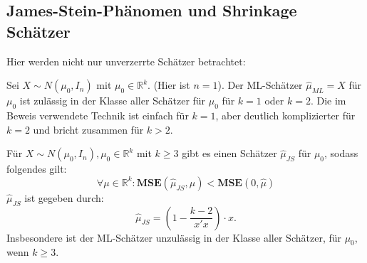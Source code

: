 \documentclass[10pt]{article}
\newcommand{\IR}{\mathbb{R}} %
\newcommand{\MSE}{\textbf{MSE}} %
\begin{document}
	\subsection{James-Stein-Phänomen und Shrinkage Schätzer}

	Hier werden nicht nur unverzerrte Schätzer betrachtet:
	
	\begin{Proposition}
		Sei $X \sim N(\mu_0, I_n)$ mit $\mu_0 \in \IR^k.$ (Hier ist $n=1$). Der ML-Schätzer $\hat{\mu}_{ML} = X$ für $\mu_0$ ist zulässig in der Klasse aller Schätzer für $\mu_0$ für $k=1$ oder $k=2$. Die im Beweis verwendete Technik ist einfach für $k=1$, aber deutlich komplizierter für $k=2$ und bricht zusammen für $k>2$. 
		
		Für $X \sim N(\mu_0, I_n), \mu_0 \in \IR^k$ mit $k \geq 3$ gibt es einen Schätzer $\hat{\mu}_{JS}$ für $\mu_0$, sodass folgendes gilt:
		\begin{equation*}
			\forall \mu \in \IR^k: \MSE(\hat{\mu}_{JS}, \mu) < \MSE(0,\hat{\mu})
		\end{equation*}
		$\hat{\mu}_{JS}$ ist gegeben durch:
		\begin{equation*}
			\hat{\mu}_{JS} = \left(1-\frac{k-2}{x'x}\right) \cdot x.
		\end{equation*}
		Insbesondere ist der ML-Schätzer unzulässig in der Klasse aller Schätzer, für $\mu_0$, wenn $k \geq 3$. 
	\end{Proposition}
\end{document}
